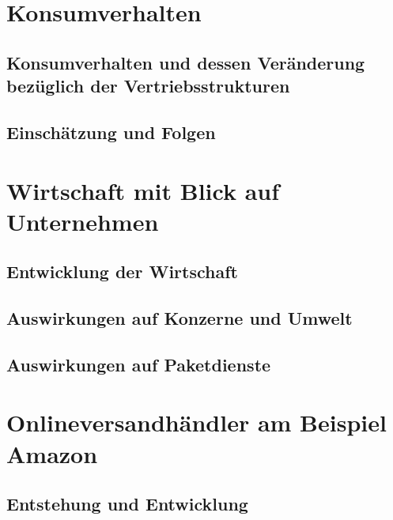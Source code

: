 \documentclass[a4paper, 12pt]{scrartcl}
\begin{document}
        
        
    \section{Konsumverhalten}
            
        \subsection{Konsumverhalten und dessen Veränderung bezüglich der Vertriebsstrukturen}
            
            
        \subsection{Einschätzung und Folgen}
            
        \newpage
            
            
            
    \section{Wirtschaft mit Blick auf Unternehmen}
            
        \subsection{Entwicklung der Wirtschaft}
            
        \subsection{Auswirkungen auf Konzerne und Umwelt}
            
        \subsection{Auswirkungen auf Paketdienste}
            
        \newpage
        
        
        
    \section{Onlineversandhändler am Beispiel Amazon} 
        
        \subsection{Entstehung und Entwicklung}
            
            
\end{document}

